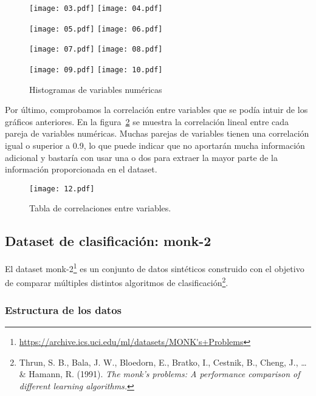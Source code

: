 \documentclass[a4paper, 11pt]{article}
\begin{document}
\begin{figure}
  \centering
  \texttt{[image: 03.pdf]}
  \hfill
  \texttt{[image: 04.pdf]}
  
  \texttt{[image: 05.pdf]}
  \hfill
  \texttt{[image: 06.pdf]}

  \texttt{[image: 07.pdf]}
  \hfill
  \texttt{[image: 08.pdf]}

  \texttt{[image: 09.pdf]}
  \hfill
  \texttt{[image: 10.pdf]}

  \caption{\label{fig:hist-num}Histogramas de variables numéricas}
  
\end{figure}

Por último, comprobamos la correlación entre variables que se podía intuir de los gráficos anteriores. En la figura~\ref{fig:abacorr} se muestra la correlación lineal entre cada pareja de variables numéricas. Muchas parejas de variables tienen una correlación igual o superior a 0.9, lo que puede indicar que no aportarán mucha información adicional y bastaría con usar una o dos para extraer la mayor parte de la información proporcionada en el dataset.

\begin{figure}
  \texttt{[image: 12.pdf]}
  \caption{\label{fig:abacorr}Tabla de correlaciones entre variables.}
  
\end{figure}

\subsection{Dataset de clasificación: monk-2}

El dataset monk-2\footnote{\url{https://archive.ics.uci.edu/ml/datasets/MONK's+Problems}} es un conjunto de datos sintéticos construido con el objetivo de comparar múltiples distintos algoritmos de clasificación\footnote{Thrun, S. B., Bala, J. W., Bloedorn, E., Bratko, I., Cestnik, B., Cheng, J., \ldots \& Hamann, R. (1991). \textit{The monk's problems: A performance comparison of different learning algorithms.}}.


\subsubsection{Estructura de los datos}
\end{document}
